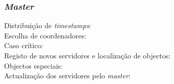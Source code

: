 \subsubsection{\textit{Master}}

\begin{description}

\item[Distribuição de \textit{timestamps}:]

\item[Escolha de coordenadores:]

\item[Caso crítico:]

\item[Registo de novos servidores e localização de objectos:]

\item[Objectos especiais:]

\item[Actualização dos servidores pelo \textit{master}:]

\end{description}
